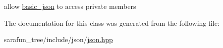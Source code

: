 allow \hyperlink{classnlohmann_1_1basic__json}{basic\-\_\-json} to access private members 



The documentation for this class was generated from the following file\-:\begin{DoxyCompactItemize}
\item 
sarafun\-\_\-tree/include/json/\hyperlink{sarafun__tree_2include_2json_2json_8hpp}{json.\-hpp}\end{DoxyCompactItemize}
